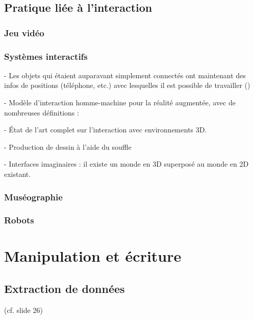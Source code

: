 \documentclass[french,12pt]{article}
\begin{document}
\subsection{Pratique liée à l'interaction}

\subsubsection{Jeu vidéo}
\cite{le_prado_ecriture_2013}
\cite{salazar_modelisation_2004}

\subsubsection{Systèmes interactifs}

- Les objets qui étaient auparavant simplement connectés ont maintenant des infos de positions (téléphone, etc.) avec lesquelles il est possible de travailler (\cite{beal_spacetime_2015})

- Modèle d'interaction homme-machine pour la réalité augmentée, avec de nombreuses définitions : \cite{chalon_realite_2004}

- État de l'art complet sur l'interaction avec environnements 3D.
\cite{jankowski_advances_2015}

- Production de dessin à l'aide du souffle
\cite{shen_blowbrush:_2014}

- Interfaces imaginaires : il existe un monde en 3D superposé au monde en 2D existant.
\cite{gustafson_imaginary_2010}
\subsubsection{Muséographie}
\cite{adhitya_composing_2012}
\cite{michael_comparative_2010}
\cite{azough_modeet_2014}
\cite{kidd_multi-touch_2011}
\subsubsection{Robots}
\cite{lee_virtual_2014} %

\section{Manipulation et écriture}

\subsection{Extraction de données}
\cite{li_aesthetic_2009} (cf. slide 26)
\end{document}
